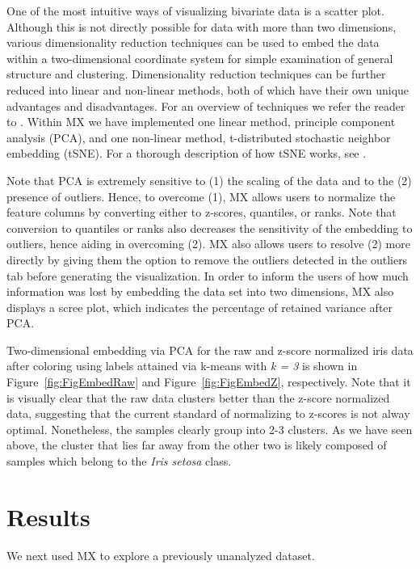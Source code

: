 \documentclass[12pt]{article}
\begin{document}
One of the most intuitive ways of visualizing bivariate data is a scatter plot. Although this is not directly possible for data with more than two dimensions, various dimensionality reduction techniques can be used to embed the data within a two-dimensional coordinate system for simple examination of general structure and clustering. Dimensionality reduction techniques can be further reduced into linear and non-linear methods, both of which have their own unique advantages and disadvantages. For an overview of techniques we refer the reader to \cite{van2009dimensionality}. Within MX we have implemented one linear method, principle component analysis (PCA), and one non-linear method, t-distributed stochastic neighbor embedding (tSNE). For a thorough description of how tSNE works, see \cite{van2008visualizing}.

Note that PCA is extremely sensitive to (1) the scaling of the data and to the (2) presence of outliers.  Hence, to overcome (1), MX allows users to normalize the feature columns by converting either to z-scores, quantiles, or ranks. Note that conversion to quantiles or ranks also decreases the sensitivity of the embedding to outliers, hence aiding in overcoming (2). MX also allows users to resolve (2) more directly by giving them the option to remove the outliers detected in the outliers tab before generating the visualization. In order to inform the users of how much information was lost by embedding the data set into two dimensions, MX also displays a scree plot, which indicates the percentage of retained variance after PCA. 

Two-dimensional embedding via PCA for the raw  and z-score normalized iris data after coloring using labels attained via k-means with \textit{k = 3} is shown in Figure~\ref{fig:FigEmbedRaw} and Figure~\ref{fig:FigEmbedZ}, respectively. Note that it is visually clear that the raw data clusters better than the z-score normalized data, suggesting that the current standard of normalizing to z-scores is not alway optimal. Nonetheless, the samples clearly group into 2-3 clusters. As we have seen above, the cluster that lies far away from the other two is likely composed of samples which belong to the \textit{Iris setosa} class.

\section{Results}
\label{sec:res}
We next used MX to explore a previously unanalyzed dataset.
\end{document}
